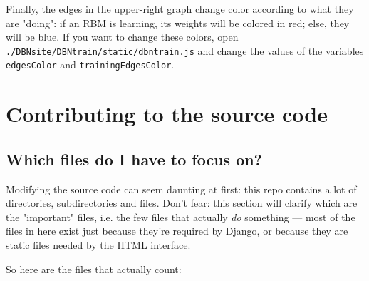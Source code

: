 \documentclass[a4paper]{article}
\begin{document}
Finally, the edges in the upper-right graph change color according to what they are "doing": if an RBM is learning, its weights will be colored in red; else, they will be blue. If you want to change these colors, open \texttt{./DBNsite/DBNtrain/static/dbntrain.js} and change the values of the variables \texttt{edgesColor} and \texttt{trainingEdgesColor}.
	


		
	\section{Contributing to the source code}


		
	\subsection{Which files do I have to focus on?}

		
Modifying the source code can seem daunting at first: this repo contains a lot of directories, subdirectories and files. Don't fear: this section will clarify which are the "important" files, i.e. the few files that actually \emph{do} something --- most of the files in here exist just because they're required by Django, or because they are static files needed by the HTML interface.
		
So here are the files that actually count:
		
\end{document}
